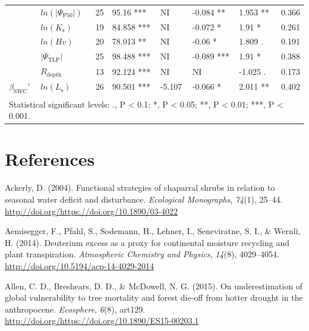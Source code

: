 \documentclass[11pt,twoside]{reedthesis}
\begin{document}
\begin{table}
{\begin{tabular}[t]{llrllllr}
\cmidrule{1-8}
 & $ln(\rvert\Psi_{\text{P50}}\rvert)$ & 25 & 95.16 *** & NI & -0.084 ** & 1.953 ** & 0.366\\
\cmidrule{2-8}
 & $ln(K_{\text{s}})$ & 19 & 84.858 *** & NI & -0.072 * & 1.91 * & 0.261\\
\cmidrule{2-8}
 & $ln(Hv)$ & 20 & 78.013 ** & NI & -0.06 * & 1.809 . & 0.191\\
\cmidrule{2-8}
 & $\rvert\Psi_{\text{TLP}}\rvert$ & 25 & 98.488 *** & NI & -0.089 *** & 1.91 * & 0.388\\
\cmidrule{2-8}
 & $R_{\text{depth}}$ & 13 & 92.124 *** & NI & NI & -1.025 . & 0.173\\
\cmidrule{2-8}
\multirow{-6}{*}{\raggedright\arraybackslash $\beta_{\text{SWC}}'$} & $ln(L_{\text{s}})$ & 26 & 90.501 *** & -5.107 & -0.066 * & 2.011 ** & 0.402\\
\bottomrule
\multicolumn{8}{l}{\textsuperscript{} Statistical significant levels: ., P < 0.1; *, P < 0.05; **, P < 0.01; ***, P < 0.001.}\\
\end{tabular}}
\end{table}
\chapter*{References}\label{references}


\noindent

\setlength{\parindent}{-0.20in} \setlength{\leftskip}{0.20in}
\setlength{\parskip}{8pt}

\hypertarget{refs}{}
\hypertarget{ref-Ackerly2004}{}
Ackerly, D. (2004). Functional strategies of chaparral shrubs in
relation to seasonal water deficit and disturbance. \emph{Ecological
Monographs}, \emph{74}(1), 25--44.
\url{http://doi.org/https://doi.org/10.1890/03-4022}

\hypertarget{ref-Aemisegger2014}{}
Aemisegger, F., Pfahl, S., Sodemann, H., Lehner, I., Seneviratne, S. I.,
\& Wernli, H. (2014). Deuterium excess as a proxy for continental
moisture recycling and plant transpiration. \emph{Atmospheric Chemistry
and Physics}, \emph{14}(8), 4029--4054.
\url{http://doi.org/10.5194/acp-14-4029-2014}

\hypertarget{ref-Allen2015}{}
Allen, C. D., Breshears, D. D., \& McDowell, N. G. (2015). On
underestimation of global vulnerability to tree mortality and forest
die-off from hotter drought in the anthropocene. \emph{Ecosphere},
\emph{6}(8), art129.
\url{http://doi.org/https://doi.org/10.1890/ES15-00203.1}
\end{document}
